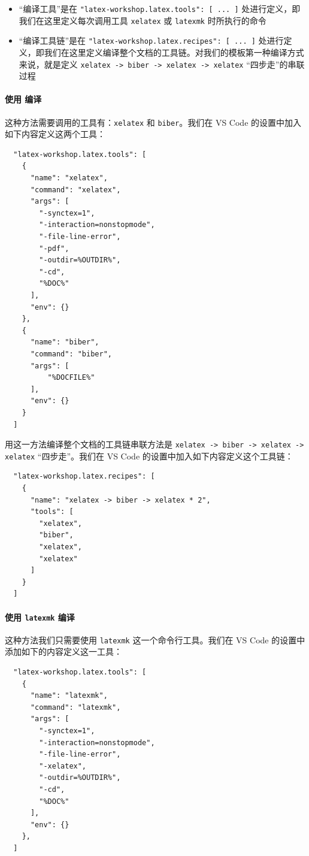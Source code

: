 \begin{itemize}
  \item “编译工具”是在 \texttt{"latex-workshop.latex.tools": [ ... ]} 处进行定义，即我们在这里定义每次调用工具 \texttt{xelatex} 或 \texttt{latexmk} 时所执行的命令
  \item “编译工具链”是在 \texttt{"latex-workshop.latex.recipes": [ ... ]} 处进行定义，即我们在这里定义编译整个文档的工具链。对我们的模板第一种编译方式来说，就是定义 \texttt{xelatex -> biber -> xelatex -> xelatex} “四步走”的串联过程
\end{itemize}

\paragraph{使用  编译}
这种方法需要调用的工具有：\texttt{xelatex} 和 \texttt{biber}。我们在 VS Code 的设置中加入如下内容定义这两个工具：

\begin{verbatim}
  "latex-workshop.latex.tools": [
    {
      "name": "xelatex",
      "command": "xelatex",
      "args": [
        "-synctex=1",
        "-interaction=nonstopmode",
        "-file-line-error",
        "-pdf",
        "-outdir=%OUTDIR%",
        "-cd",
        "%DOC%"
      ],
      "env": {}
    },
    {
      "name": "biber",
      "command": "biber",
      "args": [
          "%DOCFILE%"
      ],
      "env": {}
    }
  ]
\end{verbatim}

用这一方法编译整个文档的工具链串联方法是 \texttt{xelatex -> biber -> xelatex -> xelatex} “四步走”。我们在 VS Code 的设置中加入如下内容定义这个工具链：

\begin{verbatim}
  "latex-workshop.latex.recipes": [
    {
      "name": "xelatex -> biber -> xelatex * 2",
      "tools": [
        "xelatex",
        "biber",
        "xelatex",
        "xelatex"
      ]
    }
  ]
\end{verbatim}

\paragraph{使用 \texttt{latexmk} 编译}

这种方法我们只需要使用 \texttt{latexmk} 这一个命令行工具。我们在 VS Code 的设置中添加如下的内容定义这一工具：

\begin{verbatim}
  "latex-workshop.latex.tools": [
    {
      "name": "latexmk",
      "command": "latexmk",
      "args": [
        "-synctex=1",
        "-interaction=nonstopmode",
        "-file-line-error",
        "-xelatex",
        "-outdir=%OUTDIR%",
        "-cd",
        "%DOC%"
      ],
      "env": {}
    },
  ]
\end{verbatim}

